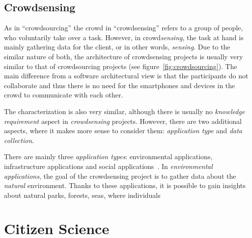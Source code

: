 \subsection*{Crowdsensing}
As in ``crowdsourcing'' the crowd in ``crowdsensing'' refers to a group of people, who voluntarily take over a task.
However, in crowd\textit{sensing}, the task at hand is mainly gathering data for the client, or in other words, \textit{sensing}.
Due to the similar nature of both, the architecture of crowdsensing projects is usually very similar to that of crowdsourcing projects (see figure~\ref{fig:crowdsourcing}).
The main difference from a software architectural view is that the participants do not collaborate and thus there is no need for the smartphones and devices in the crowd to communicate with each other.

The characterization is also very similar, although there is usually no \textit{knowledge requirement} aspect in \textit{crowdsensing} projects.
However, there are two additional aspects, where it makes more sense to consider them: \textit{application type} and \textit{data collection}.

There are mainly three \textit{application types}: environmental applications, infrastructure applications and social applications~\cite{ganti2011mobile}.
In \textit{environmental applications}, the goal of the crowdsensing project is to gather data about the \textit{natural} environment.
Thanks to these applications, it is possible to gain insights about natural parks, forests, seas, where individuals  


\section{Citizen Science}
\label{sec:citizen_science_background}